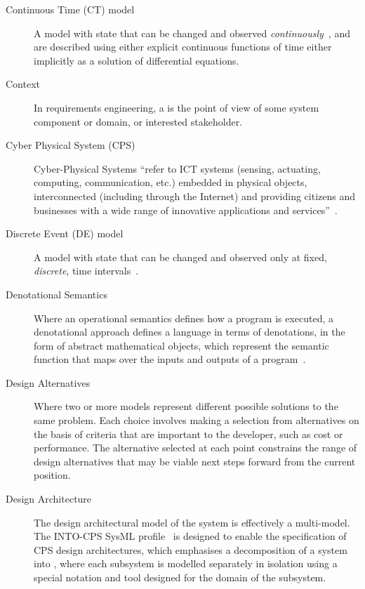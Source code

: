 \begin{description}
\item[Continuous Time (CT) model] A model with state that can be changed and observed \emph{continuously}~\cite{Amerongen10}, and are described using either explicit continuous functions of time  either implicitly as a solution of differential equations.

\item[Context] In requirements engineering, a  is the point of view of some system component or domain, or interested stakeholder.

\item[Cyber Physical System (CPS)] Cyber-Physical Systems ``refer to ICT systems (sensing, actuating, computing, communication, etc.) embedded in physical objects, interconnected (including through the Internet) and providing citizens and businesses with a wide range of innovative applications and services''~\cite{Thompson13, Deka&15}.

\item[Discrete Event (DE) model] A model with state that can be changed and observed only at fixed, \emph{discrete}, time intervals~\cite{Amerongen10}.

\item[Denotational Semantics] Where an operational semantics defines how a program is executed, a denotational approach defines a language in terms of denotations, in the form of abstract mathematical objects, which represent the semantic function that maps over the inputs and outputs of a program~\cite{Scott&71}.

\item[Design Alternatives] Where two or more models represent different possible solutions to the same problem. Each choice involves making a selection from alternatives on the basis of criteria that are important to the developer, such as cost or performance. The alternative selected at each point constrains the range of design alternatives that may be viable next steps forward from the current position.

\item[Design Architecture]  The design architectural model of the system is effectively a multi-model. The INTO-CPS SysML profile~\cite{INTOCPSD2.1a} is designed to enable the specification of CPS design architectures, which emphasises a decomposition of a system into , where each subsystem is modelled separately in isolation using a special notation and tool designed for the domain of the subsystem.


\end{description}
